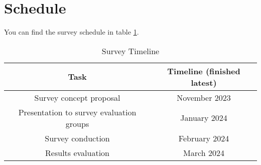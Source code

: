 \documentclass[%
class=scrreprt,
chapterprefix=false,%
open=right,%
twoside=false,%
paper=a4,%
logofile={Logo\_zentral\_farbig\_EN.png},%
thesistype=masterproposal,%
UKenglish,%
]{se2thesis}
\begin{document}


\section{Schedule}
You can find the survey schedule in table \ref{tab:survey-timeline}.

\begin{table}[ht]
	\centering
	\begin{tabular}{|c|c|}
		\hline
		\textbf{Task} & \textbf{Timeline (finished latest)} \\
		\hline
		Survey concept proposal & November 2023 \\
		\hline
		Presentation to survey evaluation groups & January 2024 \\
		\hline
		Survey conduction & February 2024 \\
		\hline
		Results evaluation & March 2024 \\
		\hline
	\end{tabular}
	\caption{Survey Timeline}
	\label{tab:survey-timeline}
\end{table}
\end{document}
